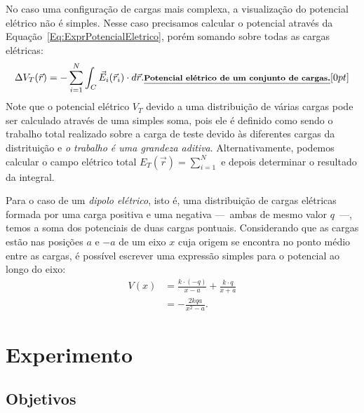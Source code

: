 No caso uma configuração de cargas mais complexa, a visualização do potencial elétrico não é simples. Nesse caso precisamos calcular o potencial através da Equação~\eqref{Eq:ExprPotencialEletrico}, porém somando sobre todas as cargas elétricas:
\begin{equation}\label{Eq:ExprPotencialEletricoConjCargas}
    \Delta V_T(\vec{r}) = - \sum_{i=1}^{N}\int_C \vec{E}_i(\vec{r}_i) \cdot d\vec{r}. \relax{\footnotesize\emph{\textbf{Potencial elétrico de um conjunto de cargas.}}}[0pt]
\end{equation}
%
Note que o potencial elétrico $V_T$ devido a uma distribuição de várias cargas pode ser calculado através de uma simples soma, pois ele é definido como sendo o trabalho total realizado sobre a carga de teste devido às diferentes cargas da distrituição e \emph{o trabalho é uma grandeza aditiva}. Alternativamente, podemos calcular o campo elétrico total $E_T(\vec{r}) = \sum_{i = 1}^{N}$ e depois determinar o resultado da integral.

Para o caso de um \emph{dipolo elétrico}, isto é, uma distribuição de cargas elétricas formada por uma carga positiva e uma negativa ---~ambas de mesmo valor $q$~---, temos a soma dos potenciais de duas cargas pontuais. Considerando que as cargas estão nas posições $a$ e $-a$ de um eixo $x$ cuja origem se encontra no ponto médio entre as cargas, é possível escrever uma expressão simples para o potencial ao longo do eixo:
\begin{align}
    V(x) &= \frac{k\cdot(-q)}{x-a} + \frac{k\cdot q}{x + a} \\
    &= -\frac{2kqa}{x^2 - a}.
\end{align}



\section{Experimento}

\subsection{Objetivos}

